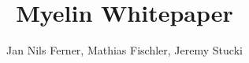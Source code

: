 \documentclass[a4paper]{article}
\title{Myelin Whitepaper}
\author{Jan Nils Ferner, Mathias Fischler, Jeremy Stucki}
\begin{document}
\maketitle
\thispagestyle{empty}

\clearpage

\twocolumn

\begin{abstract}
    
\end{abstract}

\clearpage

\onecolumn
\tableofcontents
\twocolumn

\clearpage







\clearpage

\listoffigures

\clearpage

\nocite{*}


\end{document}
